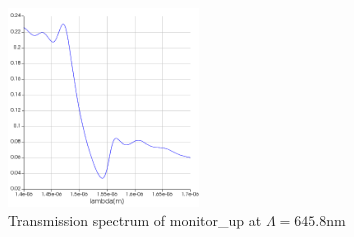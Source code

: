\documentclass[fontsize=11pt]{scrartcl}
\begin{document}
\subsection{}
\begin{figure}[H]
    \centering
     \includegraphics[width=0.45\textwidth]{img/fig3.2.png}
     \caption{Transmission spectrum of monitor\_up at $\Lambda=645.8\mathrm{nm}$}
     \label{fig3.2}
\end{figure}
\end{document}
